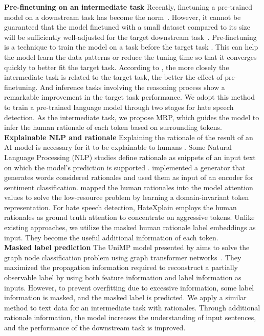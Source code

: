 \documentclass[11pt]{article}
\begin{document}
\noindent
\textbf{Pre-finetuning on an intermediate task} 
Recently, finetuning a pre-trained model on a downstream task has become the norm~\citep{howard2018universal, radford2018improving}. However, it cannot be guaranteed that the model finetuned with a small dataset compared to its size will be sufficiently well-adjusted for the target downstream task~\citep{phang2018sentence}. Pre-finetuning is a technique to train the model on a task before the target task \citep{aghajanyan2021muppet}. This can help the model learn the data patterns or reduce the tuning time so that it converges quickly to better fit the target task. According to \citet{pruksachatkun2020intermediate, aghajanyan2021muppet}, the more closely the intermediate task is related to the target task, the better the effect of pre-finetuning. And inference tasks involving the reasoning process show a remarkable improvement in the target task performance. We adopt this method to train a pre-trained language model through two stages for hate speech detection. As the intermediate task, we propose MRP, which guides the model to infer the human rationale of each token based on surrounding tokens.  \\
\noindent
\textbf{Explainable NLP and rationale}  
Explaining the rationale of the result of an AI model is necessary for it to be explainable to humans \citep{liu2018towards}. Some Natural Language Processing (NLP) studies define rationale as snippets of an input text on which the model's prediction is supported \citep{hancock2018training, lei2016rationalizing}. \citet{lei2016rationalizing} implemented a generator that generates words considered rationales and used them as input of an encoder for sentiment classification. \citet{bao2018deriving} mapped the human rationales into the model attention values to solve the low-resource problem by learning a domain-invariant token representation. For hate speech detection, HateXplain employs the human rationales as ground truth attention to concentrate on aggressive tokens. Unlike existing approaches, we utilize the masked human rationale label embeddings as input. They become the useful additional information of each token. \\
\noindent
\textbf{Masked label prediction}    
The UniMP model presented by \citet{shi2020masked} aims to solve the graph node classification problem using graph transformer networks~\citep{yun2019graph}. 
They maximized the propagation information required to reconstruct a partially observable label by using both feature information and label information as inputs. However, to prevent overfitting due to excessive information, some label information is masked, and the masked label is predicted. We apply a similar method to text data for an intermediate task with rationales. Through additional rationale information, the model increases the understanding of input sentences, and the performance of the downstream task is improved.
\end{document}
